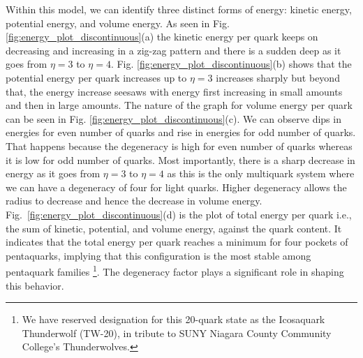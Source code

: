 \documentclass[fleqn]{article}
\begin{document}

     \begingroup
           \renewcommand{\thefootnote}{\fnsymbol{footnote}}
            Within this model, we can identify three distinct forms of energy: kinetic energy, potential energy, and volume energy. As seen in Fig. \ref{fig:energy_plot_discontinuous}(a) the kinetic energy per quark keeps on decreasing and increasing in a zig-zag pattern and there is a sudden deep as it goes from $\eta=3$ to $\eta=4$. Fig. \ref{fig:energy_plot_discontinuous}(b) shows that the potential energy per quark increases up to $\eta=3$ increases sharply but beyond that, the energy increase seesaws with energy first increasing in small amounts and then in large amounts. The nature of the graph for volume energy per quark can be seen in Fig. \ref{fig:energy_plot_discontinuous}(c). We can observe dips in energies for even number of quarks and rise in energies for odd number of quarks. That happens because the degeneracy is high for even number of quarks whereas it is low for odd number of quarks. Most importantly, there is a sharp decrease in energy as it goes from $\eta=3$ to $\eta=4$ as this is the only multiquark system where we can have a degeneracy of four for light quarks. Higher degeneracy allows the radius to decrease and hence the decrease in volume energy.  
            Fig.~\ref{fig:energy_plot_discontinuous}(d) is the plot of total energy per quark i.e., the sum of kinetic, potential, and volume energy, against the quark content.
            It indicates that the total energy per quark reaches a minimum for four pockets of pentaquarks, implying that this configuration is the most stable among pentaquark families \footnote[1]{We have reserved designation for this 20-quark state as the Icosaquark Thunderwolf (TW-20), in tribute to SUNY Niagara County Community College’s Thunderwolves.}. The degeneracy factor plays a significant role in shaping this behavior. 
        \endgroup
            
\end{document}
